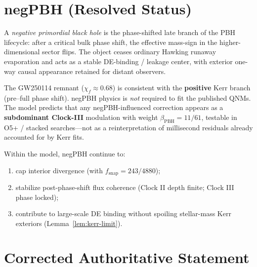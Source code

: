 \section{negPBH (Resolved Status)}
\label{sec:negpbh}

\begin{definition}[negPBH]
\label{def:negpbh}
A \emph{negative primordial black hole} is the phase-shifted late branch of the
PBH lifecycle: after a critical bulk phase shift, the effective mass-sign in
the higher-dimensional sector flips. The object ceases ordinary Hawking
runaway evaporation and acts as a stable DE-binding / leakage center, with
exterior one-way causal appearance retained for distant observers.
\end{definition}

\begin{theorem}
\label{thm:neg-gw}
The GW250114 remnant (\(\chi_f\approx 0.68\)) is consistent with the
\textbf{positive} Kerr branch (pre--full phase shift). negPBH physics is
\emph{not} required to fit the published QNMs. The model predicts that any
negPBH-influenced correction appears as a \textbf{subdominant Clock-III}
modulation with weight \(\beta_{\mathrm{PBH}}=11/61\), testable in O5+ /
stacked searches---not as a reinterpretation of millisecond residuals already
accounted for by Kerr fits.
\end{theorem}

\begin{lemma}
\label{lem:neg-roles}
Within the model, negPBH continue to:
\begin{enumerate}[label=(\roman*)]
  \item cap interior divergence (with \(f_{\mathrm{snap}}=243/4880\));
  \item stabilize post-phase-shift flux coherence (Clock II depth finite;
        Clock III phase locked);
  \item contribute to large-scale DE binding without spoiling stellar-mass Kerr
        exteriors (Lemma~\ref{lem:kerr-limit}).
\end{enumerate}
\end{lemma}

\section{Corrected Authoritative Statement}
\label{sec:statement}

